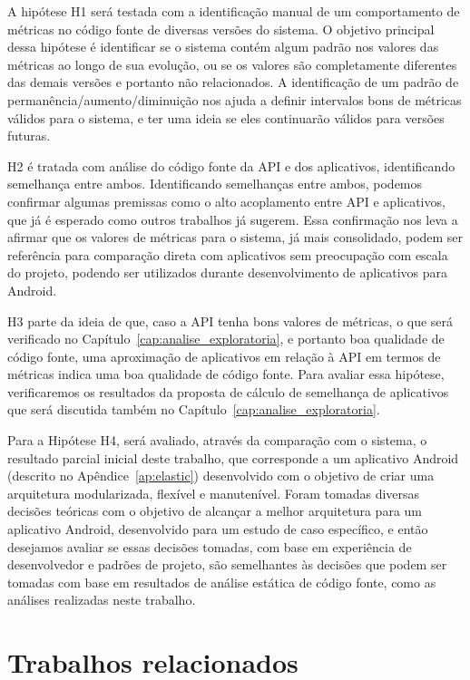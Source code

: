 A hipótese H1 será testada com a identificação manual de um comportamento de métricas no código fonte de diversas versões do sistema. O objetivo principal dessa hipótese é identificar se o sistema contém algum padrão nos valores das métricas ao longo de sua evolução, ou se os valores são completamente diferentes das demais versões e portanto não relacionados. A identificação de um padrão de permanência/aumento/diminuição nos ajuda a definir intervalos bons de métricas válidos para o sistema, e ter uma ideia se eles continuarão válidos para versões futuras.

H2 é tratada com análise do código fonte da API e dos aplicativos, identificando semelhança entre ambos. Identificando semelhanças entre ambos, podemos confirmar algumas premissas como o alto acoplamento entre API e aplicativos, que já é esperado como outros trabalhos já sugerem. Essa confirmação nos leva a afirmar que os valores de métricas para o sistema, já mais consolidado, podem ser referência para comparação direta com aplicativos sem preocupação com escala do projeto, podendo ser utilizados durante desenvolvimento de aplicativos para Android.

H3 parte da ideia de que, caso a API tenha bons valores de métricas, o que será verificado no Capítulo~\ref{cap:analise_exploratoria}, e portanto boa qualidade de código fonte, uma aproximação de aplicativos em relação à API em termos de métricas indica uma boa qualidade de código fonte. Para avaliar essa hipótese, verificaremos os resultados da proposta de cálculo de semelhança de aplicativos que será discutida também no Capítulo~\ref{cap:analise_exploratoria}.

Para a Hipótese H4, será avaliado, através da comparação com o sistema, o resultado parcial inicial deste trabalho, que corresponde a um aplicativo Android (descrito no Apêndice~\ref{ap:elastic}) desenvolvido com o objetivo de criar uma arquitetura modularizada, flexível e manutenível. Foram tomadas diversas decisões teóricas com o objetivo de alcançar a melhor arquitetura para um aplicativo Android, desenvolvido para um estudo de caso específico, e então desejamos avaliar se essas decisões tomadas, com base em experiência de desenvolvedor e padrões de projeto, são semelhantes às decisões que podem ser tomadas com base em resultados de análise estática de código fonte, como as análises realizadas neste trabalho.

\section{Trabalhos relacionados}

